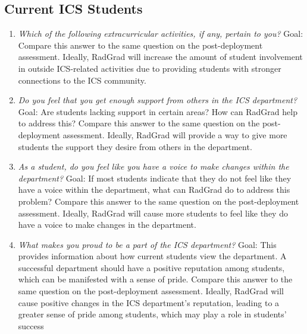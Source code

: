 \subsection{Current ICS Students}
\begin{enumerate}
\item \textit{Which of the following extracurricular activities, if any, pertain to you? }
Goal: Compare this answer to the same question on the post-deployment assessment. Ideally, RadGrad will increase the amount of student involvement in outside ICS-related activities due to providing students with stronger connections to the ICS community.
\item \textit{Do you feel that you get enough support from others in the ICS department?}
Goal: Are students lacking support in certain areas? How can RadGrad help to address this? Compare this answer to the same question on the post-deployment assessment. Ideally, RadGrad will provide a way to give more students the support they desire from others in the department. 
\item \textit{As a student, do you feel like you have a voice to make changes within the department?}
Goal: If most students indicate that they do not feel like they have a voice within the department, what can RadGrad do to address this problem? Compare this answer to the same question on the post-deployment assessment. Ideally, RadGrad will cause more students to feel like they do have a voice to make changes in the department.
\item \textit{What makes you proud to be a part of the ICS department?}
Goal: This provides information about how current students view the department. A successful department should have a positive reputation among students, which can be manifested with a sense of pride. Compare this answer to the same question on the post-deployment assessment. Ideally, RadGrad will cause positive changes in the ICS department's reputation, leading to a greater sense of pride among students, which may play a role in students' success
\end{enumerate}


